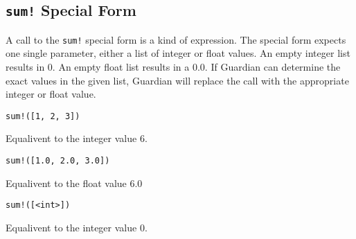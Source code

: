 
\subsection{\texttt{sum!} Special Form}
{
	A call to the \texttt{sum!} special form is a kind of expression.
	The special form expects one single parameter, either a list of integer
	or float values. An empty integer list results in 0. An empty float list
	results in a 0.0.
	If Guardian can determine the exact values in the given list, Guardian
	will replace the call with the appropriate integer or float value.
	
	\begin{itemize}
	{
		\item \texttt{sum!([1, 2, 3])}
		
			Equalivent to the integer value 6.
		
		\item \texttt{sum!([1.0, 2.0, 3.0])}
		
			Equalivent to the float value 6.0
		
		\item \texttt{sum!([<int>])}
		
			Equalivent to the integer value 0.
	}
	\end{itemize}
}
